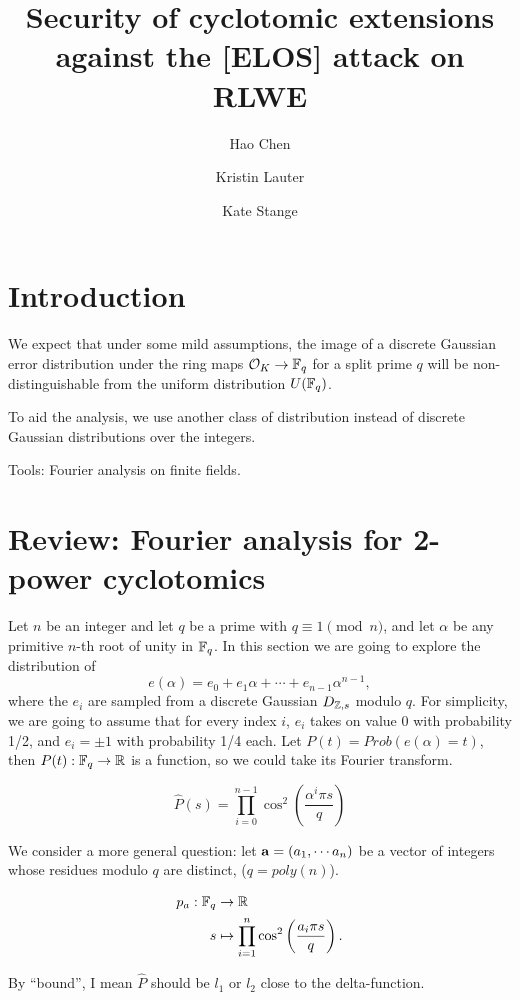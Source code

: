 \documentclass{amsart}
\title{Security of cyclotomic extensions against the [ELOS]
attack on RLWE}
\author{Hao Chen \and  Kristin Lauter \and Kate Stange}
\begin{document}
\maketitle

\section{Introduction}

We expect that under some mild assumptions, the image of a discrete Gaussian error distribution under the ring maps $\mathcal{O}_K \to \mathbb{F}_q$ for a split prime $q$ will be non-distinguishable from the uniform distribution $U(\mathbb{F}_q)$.

To aid the analysis, we use another class of distribution instead of discrete Gaussian distributions over the integers.

Tools: Fourier analysis on finite fields.

\iffalse
\section{Review: Fourier analysis for 2-power
cyclotomics}

Let $n$ be an integer and let $q$ be a prime with $q \equiv 1 \pmod{n}$, and let $\alpha$ be any primitive $n$-th root of unity in $\mathbb{F}_q$. In this section we are going to explore the distribution of
\[
    e(\alpha) = e_0 + e_1 \alpha + \cdots + e_{n-1} \alpha^{n-1},
\]
where the $e_i$ are sampled from a discrete Gaussian $D_{\mathbb{Z},s}$ modulo $q$. For simplicity,
we are going to assume that for every index $i$, $e_i$ takes on value 0 with probability 1/2, and $e_i = \pm 1$ with probability 1/4 each. Let $P(t) = Prob(e(\alpha) = t)$, then $P(t): \mathbb{F}_q \to \mathbb{R}$ is a function, so we could take its Fourier transform.

\begin{Lemma}
\[
    \hat{P}(s) = \prod_{i=0}^{n-1} \cos^2 \left(\frac{\alpha^i \pi s}{q} \right)
\]
\end{Lemma}

We  consider a more general question: let ${\bf a} = (a_1,\cdots a_n)$ be a vector of integers whose residues modulo $q$ are distinct, ($q = poly(n)$).

\begin{align*}
   p_{a} : \mathbb{F}_q & \to \mathbb{R} \\
   s & \mapsto \prod_{i=1}^n \cos^2 \left(\frac{a_i \pi s}{q} \right).
\end{align*}

By ``bound'', I mean $\hat{P}$ should be $l_1$ or $l_2$ close to the delta-function.
\end{document}
